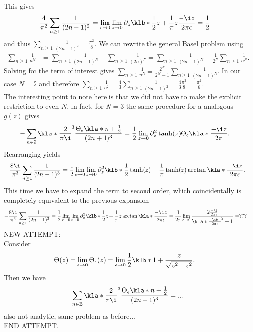 \documentclass[english, parskip=full]{scrartcl}
\begin{document}
This gives
\begin{align}
\frac{4}{\pi^2} \sum_{n\ge 1} \frac{1}{(2n-1)^2} &= \lim_{\epsilon \rightarrow 0} \lim_{z\rightarrow 0} \partial_z \klb*{\frac{1}{2} z + \frac{1}{\pi} z \frac{-\i z}{2\pi\epsilon} } = \frac{1}{2}
\end{align}
and thus $\sum_{n\ge 1} \frac{1}{(2n-1)^2} = \frac{\pi^2}{8}$.
We can rewrite the general Basel problem using
\begin{align}
\sum_{n\ge 1} \frac{1}{n^N} &= \sum_{n\ge 1} \frac{1}{(2n-1)^N} + \sum_{n\ge 1} \frac{1}{(2n)^N} = \sum_{n\ge 1} \frac{1}{(2n-1)^N} + \frac{1}{2^N} \sum_{n\ge 1} \frac{1}{n^N}.
\end{align}
Solving for the term of interest gives $\sum_{n\ge 1} \frac{1}{n^N} = \frac{2^N}{2^N - 1} \sum_{n\ge 1} \frac{1}{(2n-1)^N} $.
In our case $N=2$ and therefore $\sum_{n\ge 1} \frac{1}{n^2} = \frac{4}{3} \sum_{n\ge 1} \frac{1}{(2n-1)^2} = \frac{4}{3} \frac{\pi^2}{8} = \frac{\pi^2}{6} $.\\
The interesting point to note here is that we did not have to make the explicit restriction to even $N$.
In fact, for $N=3$ the same procedure for a analogous $g(z)$ gives
\begin{align}
-\sum_{n\in\mathbb{Z}} \kla*{\frac{2}{\pi\i}}^3 \frac{\Theta_\epsilon\kla*{n + \frac{1}{2}} }{(2n+1)^3} &= \frac{1}{2} \lim_{z\rightarrow 0} \partial_z^2 \tanh(z) \Theta_\epsilon\kla*{\frac{-\i z}{2\pi}}.
\end{align}
Rearranging yields
\begin{align}
-\frac{8\i}{\pi^3} \sum_{n\ge 1} \frac{1}{(2n-1)^3} &= \frac{1}{2} \lim_{\epsilon \rightarrow 0} \lim_{z\rightarrow 0} \partial_z^2 \klb*{\frac{1}{2} \tanh(z) + \frac{1}{\pi} \tanh(z) \arctan\kla*{\frac{-\i z}{2\pi\epsilon}} }.
\end{align}
This time we have to expand the term to second order, which coincidentally is completely equivalent to the previous expansion
\begin{align}
-\frac{8\i}{\pi^3} \sum_{n\ge 1} \frac{1}{(2n-1)^3} &= \frac{1}{2} \lim_{\epsilon \rightarrow 0} \lim_{z\rightarrow 0} \partial_z^2 \klb*{\frac{1}{2} z + \frac{1}{\pi} z \arctan\kla*{\frac{-\i z}{2\pi\epsilon}} } = \frac{1}{2\pi} \lim_{\epsilon \rightarrow 0} \frac{2 \frac{-\i}{2\pi\epsilon}}{\kla*{\frac{-\i 0^+}{2\pi\epsilon}}^2 + 1} = ???
\end{align}
NEW ATTEMPT:\\
Consider 
\begin{align}
\Theta(z) &= \lim_{\epsilon \rightarrow 0} \Theta_\epsilon(z) = \lim_{\epsilon \rightarrow 0} \frac{1}{2} \klb*{1 + \frac{z}{\sqrt{z^2 + \epsilon^2}}}.
\end{align}
Then we have
\begin{align}
-\sum_{n\in\mathbb{Z}} \kla*{\frac{2}{\pi\i}}^3 \frac{\Theta_\epsilon\kla*{n + \frac{1}{2}} }{(2n+1)^3} &= ...
\end{align}
also not analytic, same problem as before...\\
END ATTEMPT.


\end{document}
